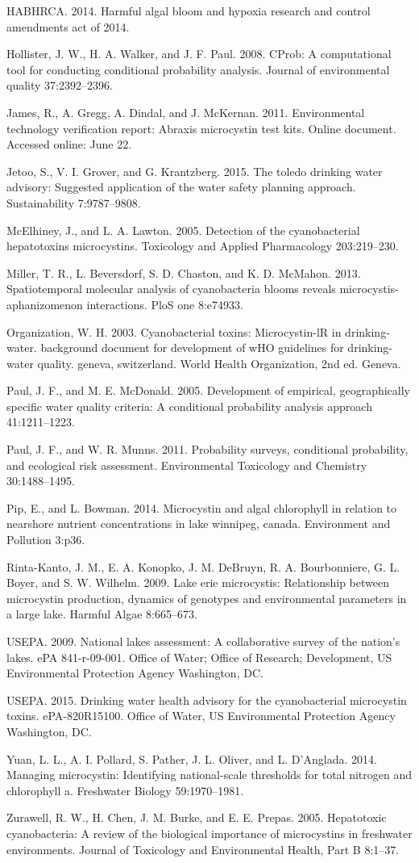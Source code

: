 \documentclass[11pt,]{article}
\begin{document}
HABHRCA. 2014. Harmful algal bloom and hypoxia research and control
amendments act of 2014.

Hollister, J. W., H. A. Walker, and J. F. Paul. 2008. CProb: A
computational tool for conducting conditional probability analysis.
Journal of environmental quality 37:2392--2396.

James, R., A. Gregg, A. Dindal, and J. McKernan. 2011. Environmental
technology verification report: Abraxis microcystin test kits. Online
document. Accessed online: June 22.

Jetoo, S., V. I. Grover, and G. Krantzberg. 2015. The toledo drinking
water advisory: Suggested application of the water safety planning
approach. Sustainability 7:9787--9808.

McElhiney, J., and L. A. Lawton. 2005. Detection of the cyanobacterial
hepatotoxins microcystins. Toxicology and Applied Pharmacology
203:219--230.

Miller, T. R., L. Beversdorf, S. D. Chaston, and K. D. McMahon. 2013.
Spatiotemporal molecular analysis of cyanobacteria blooms reveals
microcystis-aphanizomenon interactions. PloS one 8:e74933.

Organization, W. H. 2003. Cyanobacterial toxins: Microcystin-lR in
drinking-water. background document for development of wHO guidelines
for drinking-water quality. geneva, switzerland. World Health
Organization, 2nd ed. Geneva.

Paul, J. F., and M. E. McDonald. 2005. Development of empirical,
geographically specific water quality criteria: A conditional
probability analysis approach 41:1211--1223.

Paul, J. F., and W. R. Munns. 2011. Probability surveys, conditional
probability, and ecological risk assessment. Environmental Toxicology
and Chemistry 30:1488--1495.

Pip, E., and L. Bowman. 2014. Microcystin and algal chlorophyll in
relation to nearshore nutrient concentrations in lake winnipeg, canada.
Environment and Pollution 3:p36.

Rinta-Kanto, J. M., E. A. Konopko, J. M. DeBruyn, R. A. Bourbonniere, G.
L. Boyer, and S. W. Wilhelm. 2009. Lake erie microcystis: Relationship
between microcystin production, dynamics of genotypes and environmental
parameters in a large lake. Harmful Algae 8:665--673.

USEPA. 2009. National lakes assessment: A collaborative survey of the
nation's lakes. ePA 841-r-09-001. Office of Water; Office of Research;
Development, US Environmental Protection Agency Washington, DC.

USEPA. 2015. Drinking water health advisory for the cyanobacterial
microcystin toxins. ePA-820R15100. Office of Water, US Environmental
Protection Agency Washington, DC.

Yuan, L. L., A. I. Pollard, S. Pather, J. L. Oliver, and L. D'Anglada.
2014. Managing microcystin: Identifying national-scale thresholds for
total nitrogen and chlorophyll a. Freshwater Biology 59:1970--1981.

Zurawell, R. W., H. Chen, J. M. Burke, and E. E. Prepas. 2005.
Hepatotoxic cyanobacteria: A review of the biological importance of
microcystins in freshwater environments. Journal of Toxicology and
Environmental Health, Part B 8:1--37.
\end{document}
